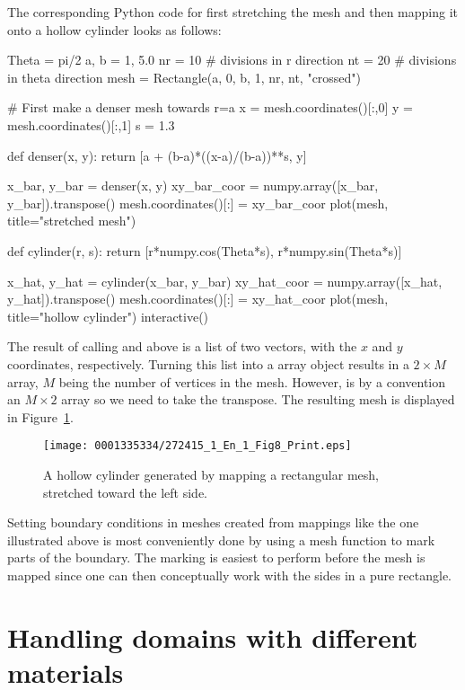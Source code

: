 The corresponding Python code for first stretching the mesh and then
mapping it onto a hollow cylinder looks as follows:
\begin{python}
Theta = pi/2
a, b = 1, 5.0
nr = 10  # divisions in r direction
nt = 20  # divisions in theta direction
mesh = Rectangle(a, 0, b, 1, nr, nt, "crossed")

# First make a denser mesh towards r=a
x = mesh.coordinates()[:,0]
y = mesh.coordinates()[:,1]
s = 1.3

def denser(x, y):
    return [a + (b-a)*((x-a)/(b-a))**s, y]

x_bar, y_bar = denser(x, y)
xy_bar_coor = numpy.array([x_bar, y_bar]).transpose()
mesh.coordinates()[:] = xy_bar_coor
plot(mesh, title="stretched mesh")

def cylinder(r, s):
    return [r*numpy.cos(Theta*s), r*numpy.sin(Theta*s)]

x_hat, y_hat = cylinder(x_bar, y_bar)
xy_hat_coor = numpy.array([x_hat, y_hat]).transpose()
mesh.coordinates()[:] = xy_hat_coor
plot(mesh, title="hollow cylinder")
interactive()
\end{python}
The result of calling  and  above is a
list of two vectors, with the $x$ and $y$ coordinates, respectively.
Turning this list into a  array object results in a $2\times
M$ array, $M$ being the number of vertices in the mesh. However,
 is by a convention an $M\times 2$ array so
we need to take the transpose. The resulting mesh is displayed in
Figure~\ref{langtangen:mesh:transform:cyl:fig1}.

\begin{figure}[!b]
\bwfig
 \centering
  \texttt{[image: 0001335334/272415\_1\_En\_1\_Fig8\_Print.eps]}
  \caption{A hollow cylinder generated by mapping a rectangular mesh,
  stretched toward the left side.}
\label{langtangen:mesh:transform:cyl:fig1}
\end{figure}

Setting boundary conditions in meshes created from mappings like the
one illustrated above is most conveniently done by using a mesh function
to mark parts of the boundary. The marking is easiest to perform before
the mesh is mapped since one can then conceptually work with the sides
in a pure rectangle.

\section{Handling domains with different materials}

